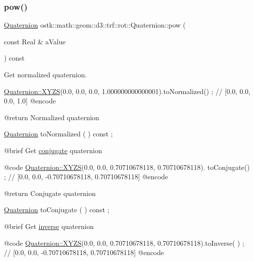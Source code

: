 \subsubsection{\texorpdfstring{pow()}{pow()}}
{\footnotesize\ttfamily \hyperlink{classostk_1_1math_1_1geom_1_1d3_1_1trf_1_1rot_1_1_quaternion}{Quaternion} ostk\+::math\+::geom\+::d3\+::trf\+::rot\+::\+Quaternion\+::pow (\begin{DoxyParamCaption}\item[{const Real \&}]{a\+Value }\end{DoxyParamCaption}) const}



Get normalized quaternion. 


\begin{DoxyCode}
                        \hyperlink{classostk_1_1math_1_1geom_1_1d3_1_1trf_1_1rot_1_1_quaternion_ac57ea57a4033622ed1389101b2e58c76}{Quaternion::XYZS}(0.0, 0.0, 0.0, 1.000000000000001).toNormalized() ;
       \textcolor{comment}{// [0.0, 0.0, 0.0, 1.0]}
    @encode
   
    @\textcolor{keywordflow}{return}             Normalized quaternion

\hyperlink{classostk_1_1math_1_1geom_1_1d3_1_1trf_1_1rot_1_1_quaternion_ad9fd7d8eb5effb4d4e0394bbb5bb86dc}{Quaternion}              toNormalized                                ( ) \textcolor{keyword}{const} ;

    @brief              Get \hyperlink{classostk_1_1math_1_1geom_1_1d3_1_1trf_1_1rot_1_1_quaternion_a7d975785f2a7f4cc83d9410e37908b11}{conjugate} quaternion
   
    @code
                        \hyperlink{classostk_1_1math_1_1geom_1_1d3_1_1trf_1_1rot_1_1_quaternion_ac57ea57a4033622ed1389101b2e58c76}{Quaternion::XYZS}(0.0, 0.0, 0.70710678118, 0.70710678118).
      toConjugate() ; \textcolor{comment}{// [0.0, 0.0, -0.70710678118, 0.70710678118]}
    @encode
   
    @\textcolor{keywordflow}{return}             Conjugate quaternion

\hyperlink{classostk_1_1math_1_1geom_1_1d3_1_1trf_1_1rot_1_1_quaternion_ad9fd7d8eb5effb4d4e0394bbb5bb86dc}{Quaternion}              toConjugate                                 ( ) \textcolor{keyword}{const} ;

    @brief              Get \hyperlink{classostk_1_1math_1_1geom_1_1d3_1_1trf_1_1rot_1_1_quaternion_a75b09159acd3346e3ad848b0162181f4}{inverse} quaternion
   
    @code
                        \hyperlink{classostk_1_1math_1_1geom_1_1d3_1_1trf_1_1rot_1_1_quaternion_ac57ea57a4033622ed1389101b2e58c76}{Quaternion::XYZS}(0.0, 0.0, 0.70710678118, 0.70710678118).toInverse(
      ) ; \textcolor{comment}{// [0.0, 0.0, -0.70710678118, 0.70710678118]}
    @encode
   

\end{DoxyCode}
